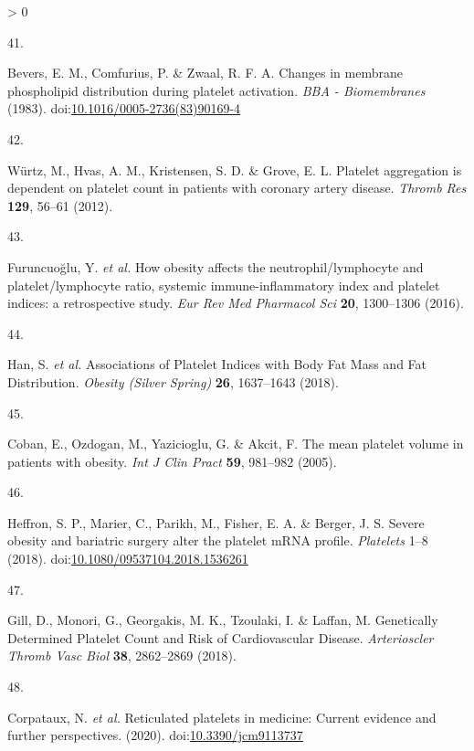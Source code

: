 \documentclass[11pt,twoside]{bristolthesis}
\newlength{\cslhangindent}
\newlength{\csllabelwidth}
\newenvironment{CSLReferences}[2] %
 {%
  \setlength{\parindent}{0pt}
  \ifodd #1 \everypar{\setlength{\hangindent}{\cslhangindent}}\ignorespaces\fi
  \ifnum #2 > 0
  \setlength{\parskip}{#2\baselineskip}
  \fi
 }%
 {}
\newcommand{\CSLLeftMargin}[1]{\parbox[t]{\csllabelwidth}{#1}}
\newcommand{\CSLRightInline}[1]{\parbox[t]{\linewidth - \csllabelwidth}{#1}\break}
\begin{document}
\begin{CSLReferences}{0}{0}
\leavevmode\hypertarget{ref-Bevers1983}{}%
\CSLLeftMargin{41. }
\CSLRightInline{Bevers, E. M., Comfurius, P. \& Zwaal, R. F. A. {Changes in membrane phospholipid distribution during platelet activation}. \emph{BBA - Biomembranes} (1983). doi:\href{https://doi.org/10.1016/0005-2736(83)90169-4}{10.1016/0005-2736(83)90169-4}}

\leavevmode\hypertarget{ref-Wurtz2012}{}%
\CSLLeftMargin{42. }
\CSLRightInline{Würtz, M., Hvas, A. M., Kristensen, S. D. \& Grove, E. L. {Platelet aggregation is dependent on platelet count in patients with coronary artery disease}. \emph{Thromb Res} \textbf{129}, 56--61 (2012).}

\leavevmode\hypertarget{ref-Furuncuoglu2016}{}%
\CSLLeftMargin{43. }
\CSLRightInline{Furuncuoğlu, Y. \emph{et al.} {How obesity affects the neutrophil/lymphocyte and platelet/lymphocyte ratio, systemic immune-inflammatory index and platelet indices: a retrospective study}. \emph{Eur Rev Med Pharmacol Sci} \textbf{20}, 1300--1306 (2016).}

\leavevmode\hypertarget{ref-Han2018a}{}%
\CSLLeftMargin{44. }
\CSLRightInline{Han, S. \emph{et al.} {Associations of Platelet Indices with Body Fat Mass and Fat Distribution}. \emph{Obesity (Silver Spring)} \textbf{26}, 1637--1643 (2018).}

\leavevmode\hypertarget{ref-Coban2005}{}%
\CSLLeftMargin{45. }
\CSLRightInline{Coban, E., Ozdogan, M., Yazicioglu, G. \& Akcit, F. {The mean platelet volume in patients with obesity}. \emph{Int J Clin Pract} \textbf{59}, 981--982 (2005).}

\leavevmode\hypertarget{ref-Heffron2018}{}%
\CSLLeftMargin{46. }
\CSLRightInline{Heffron, S. P., Marier, C., Parikh, M., Fisher, E. A. \& Berger, J. S. {Severe obesity and bariatric surgery alter the platelet mRNA profile}. \emph{Platelets} 1--8 (2018). doi:\href{https://doi.org/10.1080/09537104.2018.1536261}{10.1080/09537104.2018.1536261}}

\leavevmode\hypertarget{ref-Gill2018}{}%
\CSLLeftMargin{47. }
\CSLRightInline{Gill, D., Monori, G., Georgakis, M. K., Tzoulaki, I. \& Laffan, M. {Genetically Determined Platelet Count and Risk of Cardiovascular Disease}. \emph{Arterioscler Thromb Vasc Biol} \textbf{38}, 2862--2869 (2018).}

\leavevmode\hypertarget{ref-Corpataux2020}{}%
\CSLLeftMargin{48. }
\CSLRightInline{Corpataux, N. \emph{et al.} {Reticulated platelets in medicine: Current evidence and further perspectives}. (2020). doi:\href{https://doi.org/10.3390/jcm9113737}{10.3390/jcm9113737}}


\end{CSLReferences}
\end{document}
